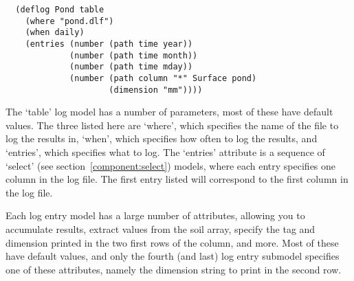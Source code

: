 \begin{verbatim}
  (deflog Pond table
    (where "pond.dlf")
    (when daily)
    (entries (number (path time year))
             (number (path time month))
             (number (path time mday))
             (number (path column "*" Surface pond)
                     (dimension "mm"))))
\end{verbatim}

The `table' log model has a number of parameters, most of these have
default values.  The three listed here are `where', which specifies
the name of the file to log the results in, `when', which specifies
how often to log the results, and `entries', which specifies what to
log.  The `entries' attribute is a sequence of `select' (see
section~\ref{component:select}) models, where each entry specifies one
column in the log file.  The first entry listed will correspond to the
first column in the log file.

Each log entry model has a large number of attributes, allowing you
to accumulate results, extract values from the soil array, specify the
tag and dimension printed in the two first rows of the column, and
more.  Most of these have default values, and only the fourth (and
last) log entry submodel specifies one of these attributes, namely the
dimension string to print in the second row.


